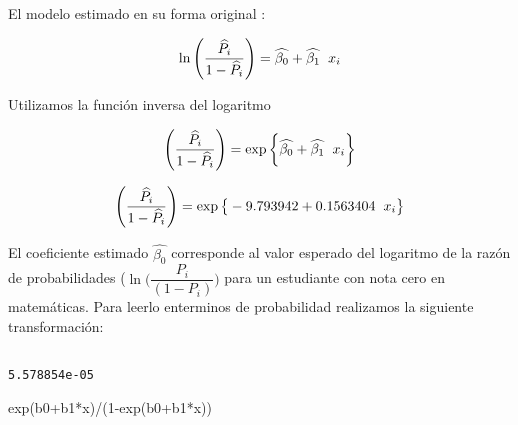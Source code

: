 \documentclass[
]{article}
\newenvironment{Shaded}{\begin{snugshade}}{\end{snugshade}}
\newcommand{\CommentTok}[1]{\textcolor[rgb]{0.56,0.35,0.01}{\textit{#1}}}
\newcommand{\DecValTok}[1]{\textcolor[rgb]{0.00,0.00,0.81}{#1}}
\newcommand{\FunctionTok}[1]{\textcolor[rgb]{0.00,0.00,0.00}{#1}}
\newcommand{\NormalTok}[1]{#1}
\newcommand{\OtherTok}[1]{\textcolor[rgb]{0.56,0.35,0.01}{#1}}
\newcommand{\SpecialCharTok}[1]{\textcolor[rgb]{0.00,0.00,0.00}{#1}}
\newcommand{\StringTok}[1]{\textcolor[rgb]{0.31,0.60,0.02}{#1}}
\begin{document}
El modelo estimado en su forma original :

\[\ln \Bigg( \dfrac{\widehat{P_{i}}}{1-\widehat{P_{i}}} \Bigg) = \widehat{\beta_{0}} + \widehat{\beta_{1}} \hspace{.2cm}x_{i}\]

Utilizamos la función inversa del logaritmo

\[\Bigg( \dfrac{\widehat{P_{i}}}{1-\widehat{P_{i}}} \Bigg) = \exp{\bigg\{ \widehat{\beta_{0}} + \widehat{\beta_{1}} \hspace{.2cm} x_{i}}\bigg\}\]

\[\Bigg( \dfrac{\widehat{P_{i}}}{1-\widehat{P_{i}}} \Bigg) = \exp{\big\{ -9.793942  + 0.1563404 \hspace{.2cm}x_{i}}\big\}\]

El coeficiente estimado \(\widehat{\beta_{0}}\) corresponde al valor
esperado del logaritmo de la razón de probabilidades
(\(\ln \Bigg(\dfrac{P_{i}}{(1-P_{i})}\Bigg)\) para un estudiante con
nota cero en matemáticas. Para leerlo enterminos de probabilidad
realizamos la siguiente transformación:

\begin{Shaded}
\end{Shaded}

\begin{verbatim}
             
5.578854e-05 
\end{verbatim}

\begin{Shaded}
\begin{Highlighting}[]
\FunctionTok{exp}\NormalTok{(b0}\SpecialCharTok{+}\NormalTok{b1}\SpecialCharTok{*}\NormalTok{x)}\SpecialCharTok{/}\NormalTok{(}\DecValTok{1}\SpecialCharTok{{-}}\FunctionTok{exp}\NormalTok{(b0}\SpecialCharTok{+}\NormalTok{b1}\SpecialCharTok{*}\NormalTok{x))}
\end{Highlighting}
\end{Shaded}
\end{document}
